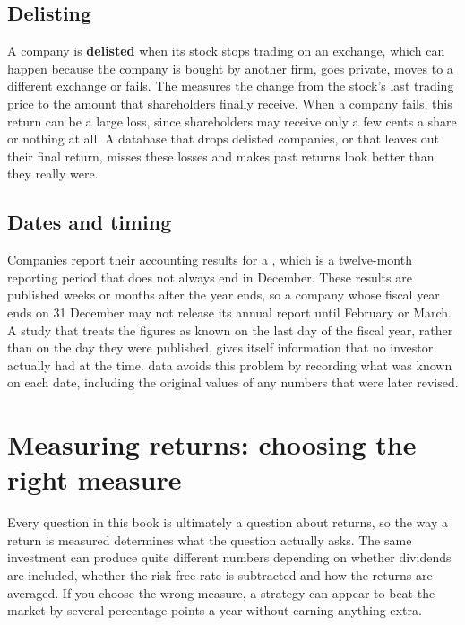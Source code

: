 \subsection{Delisting}

A company is \textbf{delisted} when its stock stops trading on an exchange, which can happen because the company is bought by another firm, goes private, moves to a different exchange or fails. The  measures the change from the stock's last trading price to the amount that shareholders finally receive. When a company fails, this return can be a large loss, since shareholders may receive only a few cents a share or nothing at all. A database that drops delisted companies, or that leaves out their final return, misses these losses and makes past returns look better than they really were.


\subsection{Dates and timing}

Companies report their accounting results for a , which is a twelve-month reporting period that does not always end in December. These results are published weeks or months after the year ends, so a company whose fiscal year ends on 31 December may not release its annual report until February or March. A study that treats the figures as known on the last day of the fiscal year, rather than on the day they were published, gives itself information that no investor actually had at the time.  data avoids this problem by recording what was known on each date, including the original values of any numbers that were later revised.

\section{Measuring returns: choosing the right measure}
\label{sec:02-returns}

Every question in this book is ultimately a question about returns, so the way a return is measured determines what the question actually asks. The same investment can produce quite different numbers depending on whether dividends are included, whether the risk-free rate is subtracted and how the returns are averaged. If you choose the wrong measure, a strategy can appear to beat the market by several percentage points a year without earning anything extra.

